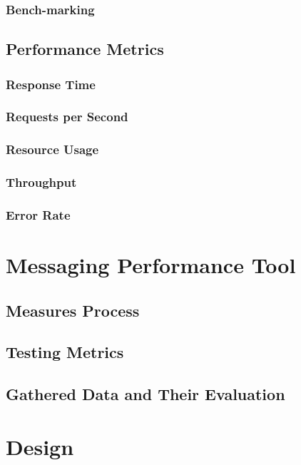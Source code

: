 \subsection*{Bench-marking}

\section{Performance Metrics}

\subsection{Response Time}

\subsection{Requests per Second}

\subsection{Resource Usage}

\subsection{Throughput}

\subsection{Error Rate}

\chapter{Messaging Performance Tool}
\section{Measures Process}

\section{Testing Metrics}

\section{Gathered Data and Their Evaluation}

\chapter{Design}

